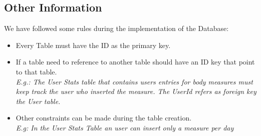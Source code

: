 \subsection{Other Information}


We have followed some rules during the implementation of the Database:
\begin{itemize}
\item Every Table must have the ID as the primary key.
\item If a table need to reference to another table should have an ID key that point to that table.\\
\textit{E.g.: The User Stats table that contains users entries for body measures must keep track the user who inserted the measure. The UserId refers as foreign key the User table.}
\item Other constraints can be made during the table creation.\\
\textit{E.g: In the User Stats Table an user can insert only a measure per day}
\end{itemize}

